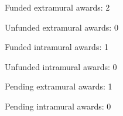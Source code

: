 \begin{tightItemize}
    \item Funded extramural awards: 2
    \item Unfunded extramural awards: 0
    \item Funded intramural awards: 1
    \item Unfunded intramural awards: 0
    \item Pending extramural awards: 1
    \item Pending intramural awards: 0
\end{tightItemize}
